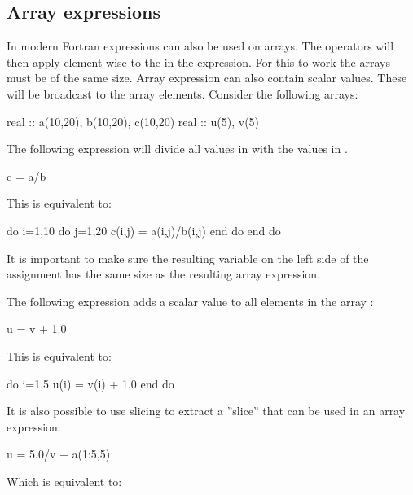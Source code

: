 \subsection{Array expressions}

In modern Fortran expressions can also be used on arrays. The operators will then apply element wise to the in the expression. For this to work the arrays must be of the same size. Array expression can also contain scalar values. These will be broadcast to the array elements. Consider the following arrays:

\begin{fortrancodeenv}
real :: a(10,20), b(10,20), c(10,20)
real :: u(5), v(5)
\end{fortrancodeenv}

The following expression will divide all values in  with the values in .

\begin{fortrancodeenv}
c = a/b
\end{fortrancodeenv}

This is equivalent to:

\begin{fortrancodeenv}
do i=1,10
    do j=1,20
        c(i,j) = a(i,j)/b(i,j)
    end do
end do
\end{fortrancodeenv}

It is important to make sure the resulting variable on the left side of the assignment has the same size as the resulting array expression.

The following expression adds a scalar value to all elements in the array :

\begin{fortrancodeenv}
u = v + 1.0
\end{fortrancodeenv}

This is equivalent to:

\begin{fortrancodeenv}
do i=1,5
    u(i) = v(i) + 1.0
end do
\end{fortrancodeenv}

It is also possible to use slicing to extract a ''slice'' that can be used in an array expression:

\begin{fortrancodeenv}
u = 5.0/v + a(1:5,5)
\end{fortrancodeenv}

Which is equivalent to:

